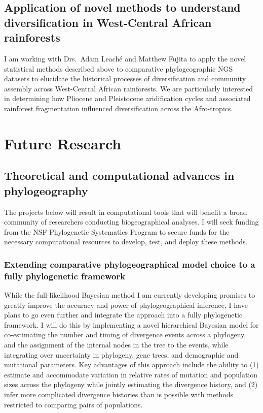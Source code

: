 \subsection*{Application of novel methods to understand diversification
in West-Central African rainforests}
I am working with Drs.\ Adam Leach\'{e} and Matthew Fujita to apply the novel
statistical methods described above to comparative phylogeographic NGS datasets
to elucidate the historical processes of diversification and community assembly
across West-Central African rainforests.
We are particularly interested in determining how Pliocene and Pleistocene
aridification cycles and associated rainforest fragmentation influenced
diversification across the Afro-tropics.


\section*{Future Research}

\subsection*{Theoretical and computational advances in phylogeography}
The projects below will result in computational tools that will benefit a broad
community of researchers conducting biogeographical analyses. I will seek
funding from the NSF Phylogenetic Systematics Program to secure funds for the
necessary computational resources to develop, test, and deploy these methods.

\subsubsection*{Extending comparative phylogeographical model choice to a fully
    phylogenetic framework}
While the full-likelihood Bayesian method I am currently developing promises to
greatly improve the accuracy and power of phylogeographical inference, I have
plans to go even further and integrate the approach into a fully phylogenetic
framework.
I will do this by implementing a novel hierarchical Bayesian model for
co-estimating the number and timing of divergence events across a phylogeny,
and the assignment of the internal nodes in the tree to the events, while
integrating over uncertainty in phylogeny, gene trees, and demographic and
mutational parameters.
Key advantages of this approach include the ability to
(1) estimate and accommodate variation in relative rates of mutation and
population sizes across the phylogeny while jointly estimating the divergence
history, and
(2) infer more complicated divergence histories than is possible with methods
restricted to comparing pairs of populations.

